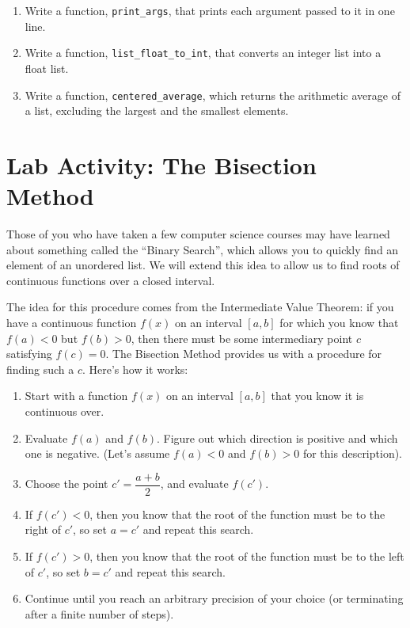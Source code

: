 \documentclass{article}
\begin{document}
\begin{enumerate}
\def\labelenumi{\arabic{enumi}.}
\itemsep1pt\parskip0pt
\item
  Write a function, \texttt{print\_args}, that prints each argument
  passed to it in one line.
\item
  Write a function, \texttt{list\_float\_to\_int}, that converts an
  integer list into a float list.
\item
  Write a function, \texttt{centered\_average}, which returns the
  arithmetic average of a list, excluding the largest and the smallest
  elements.
\end{enumerate}

\section{Lab Activity: The Bisection
Method}\label{lab-activity-the-bisection-method}

Those of you who have taken a few computer science courses may have
learned about something called the ``Binary Search'', which allows you
to quickly find an element of an unordered list. We will extend this
idea to allow us to find roots of continuous functions over a closed
interval.

The idea for this procedure comes from the Intermediate Value Theorem:
if you have a continuous function $f(x)$ on an interval $[a,b]$ for
which you know that $f(a)<0$ but $f(b)>0$, then there must be some
intermediary point $c$ satisfying $f(c)=0$. The Bisection Method
provides us with a procedure for finding such a $c$. Here's how it
works:

\begin{enumerate}
\def\labelenumi{\arabic{enumi}.}
\itemsep1pt\parskip0pt
\item
  Start with a function $f(x)$ on an interval $[a,b]$ that you know it
  is continuous over.
\item
  Evaluate $f(a)$ and $f(b)$. Figure out which direction is positive and
  which one is negative. (Let's assume $f(a)<0$ and $f(b)>0$ for this
  description).
\item
  Choose the point $c'=\dfrac{a+b}{2}$, and evaluate $f(c')$.
\item
  If $f(c')<0$, then you know that the root of the function must be to
  the right of $c'$, so set $a=c'$ and repeat this search.
\item
  If $f(c')>0$, then you know that the root of the function must be to
  the left of $c'$, so set $b=c'$ and repeat this search.
\item
  Continue until you reach an arbitrary precision of your choice (or
  terminating after a finite number of steps).
\end{enumerate}
\end{document}
